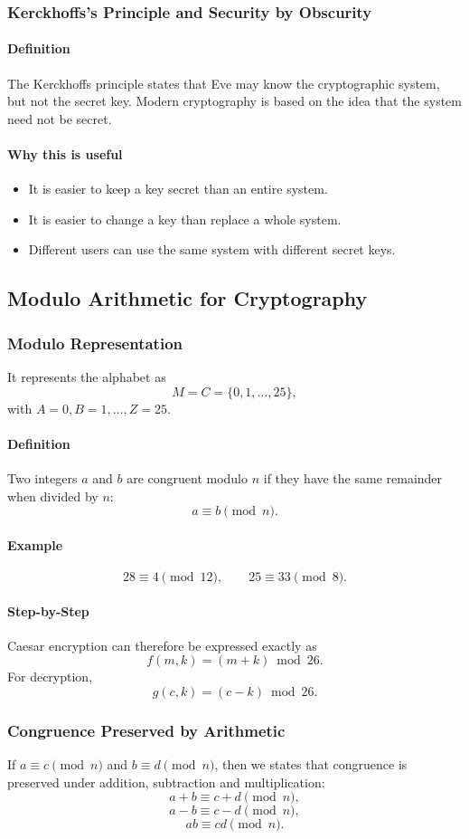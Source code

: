 \documentclass[12pt]{article}
\newcommand{\Definition}{\paragraph{Definition}}
\newcommand{\Step}{\paragraph{Step-by-Step}}
\newcommand{\Example}{\paragraph{Example}}
\begin{document}
\subsubsection{Kerckhoffs's Principle and Security by Obscurity}
\Definition The Kerckhoffs principle states that Eve may know the cryptographic system, but not the secret key. Modern cryptography is based on the idea that the system need not be secret.

\paragraph{Why this is useful}
\begin{itemize}
    \item It is easier to keep a key secret than an entire system.
    \item It is easier to change a key than replace a whole system.
    \item Different users can use the same system with different secret keys.
\end{itemize}

\subsection{Modulo Arithmetic for Cryptography}

\subsubsection{Modulo Representation}
It represents the alphabet as
\[
M=C=\{0,1,\ldots,25\},
\]
with $A=0,B=1,\ldots,Z=25$.

\Definition Two integers $a$ and $b$ are congruent modulo $n$ if they have the same remainder when divided by $n$:
\[
a\equiv b\pmod n.
\]

\Example
\[
28\equiv4\pmod{12},\qquad 25\equiv33\pmod 8.
\]

\Step
Caesar encryption can therefore be expressed exactly as
\[
f(m,k)=(m+k)\bmod26.
\]
For decryption,
\[
g(c,k)=(c-k)\bmod26.
\]

\subsubsection{Congruence Preserved by Arithmetic}
If $a\equiv c\pmod n$ and $b\equiv d\pmod n$, then we states that congruence is preserved under addition, subtraction and multiplication:
\[
a+b\equiv c+d\pmod n,
\]
\[
a-b\equiv c-d\pmod n,
\]
\[
ab\equiv cd\pmod n.
\]
\end{document}
